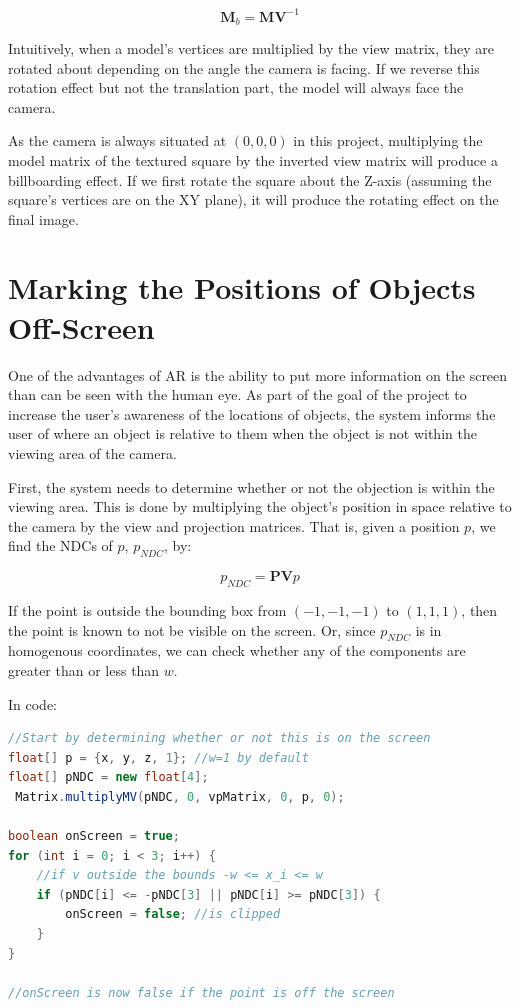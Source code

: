 \[ \textbf{M}_b = \textbf{M} \textbf{V}^{-1} \]

Intuitively, when a model's vertices are multiplied by the view matrix, they are rotated about depending on the angle the camera is facing. If we reverse this rotation effect but not the translation part, the model will always face the camera.

As the camera is always situated at $(0, 0, 0)$ in this project, multiplying the model matrix of the textured square by the inverted view matrix will produce a billboarding effect. If we first rotate the square about the Z-axis (assuming the square's vertices are on the XY plane), it will produce the rotating effect on the final image.

\section{Marking the Positions of Objects Off-Screen}
One of the advantages of AR is the ability to put more information on the screen than can be seen with the human eye. As part of the goal of the project to increase the user's awareness of the locations of objects, the system informs the user of where an object is relative to them when the object is not within the viewing area of the camera.

First, the system needs to determine whether or not the objection is within the viewing area. This is done by multiplying the object's position in space relative to the camera by the view and projection matrices. That is, given a position $p$, we find the NDCs of $p$, $p_{NDC}$, by:

\[ p_{NDC} = \mathbf{P} \mathbf{V} p \]

If the point is outside the bounding box from $(-1, -1, -1)$ to $(1, 1, 1)$, then the point is known to not be visible on the screen. Or, since $p_{NDC}$ is in homogenous coordinates, we can check whether any of the components are greater than or less than $w$.

In code:

\begin{lstlisting}[language=Java]
//Start by determining whether or not this is on the screen
float[] p = {x, y, z, 1}; //w=1 by default
float[] pNDC = new float[4];
 Matrix.multiplyMV(pNDC, 0, vpMatrix, 0, p, 0);

boolean onScreen = true;
for (int i = 0; i < 3; i++) {
	//if v outside the bounds -w <= x_i <= w
	if (pNDC[i] <= -pNDC[3] || pNDC[i] >= pNDC[3]) {
		onScreen = false; //is clipped
	}
}

//onScreen is now false if the point is off the screen
\end{lstlisting}

